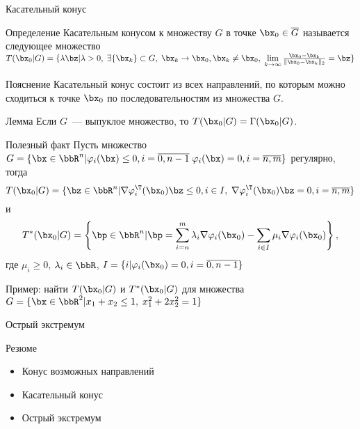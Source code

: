 \documentclass[12pt,russian]{beamer}
\begin{document}
\begin{frame}{Касательный конус}
\begin{block}{Определение}
Касательным конусом к множеству $G$ в точке $\bx_0 \in \overline{G}$ называется следующее множество $T(\bx_0 |G) = \{ \lambda \bz | \lambda > 0, \; \exists \{\bx_k\} \subset G, \; \bx_k \rightarrow \bx_0, \bx_k \neq \bx_0, \; \lim\limits_{k \rightarrow \infty} \frac{\bx_0 - \bx_k}{\|\bx_0 - \bx_k\|_2} = \bz \}$
\end{block}

\begin{block}{Пояснение}
Касательный конус состоит из всех направлений, по которым можно сходиться к точке $\bx_0$ по последовательностям из множества $G$.
\end{block}

\begin{block}{Лемма}
Если $G$~--- выпуклое множество, то $T(\bx_0|G) = \Gamma(\bx_0|G)$.
\end{block}
\end{frame}

\begin{frame}{Полезный факт}
Пусть множество $G = \{\bx \in \bbR^n | \varphi_i(\bx) \leq 0, i = \overline{0, n-1} \; \varphi_i(\bx) = 0, i = \overline{n, m} \}$ регулярно, тогда \vspace{-4mm}
\[
T(\bx_0|G) = \{ \bz \in \bbR^n | \nabla \varphi^{\T}_i(\bx_0)\bz \leq 0, i \in I, \; \nabla \varphi^{\T}_i(\bx_0)\bz = 0, i = \overline{n,m} \}
\vspace{-4mm}
\]
и \vspace{-4mm}
\[
T^*(\bx_0|G) = \left \{ \bp \in \bbR^n | \bp = \sum\limits_{i = n}^m \lambda_i \nabla \varphi_i(\bx_0) - \sum\limits_{i \in I} \mu_i \nabla \varphi_i(\bx_0) \right \},
\] 
где $\mu_i \geq 0$, $\lambda_i \in \bbR$, $I = \{i | \varphi_i(\bx_0) = 0, i = \overline{0, n-1} \}$

Пример: найти $T(\bx_0|G)$ и $T^*(\bx_0|G)$ для множества $G = \{\bx \in \bbR^2 | x_1 + x_2 \leq 1, \; x^2_1 + 2x_2^2 = 1 \}$
\end{frame}

\begin{frame}{Острый экстремум}

\end{frame}

\begin{frame}{Резюме}
\begin{itemize}
\item Конус возможных направлений
\item Касательный конус
\item Острый экстремум
\end{itemize}
\end{frame}
\end{document}

